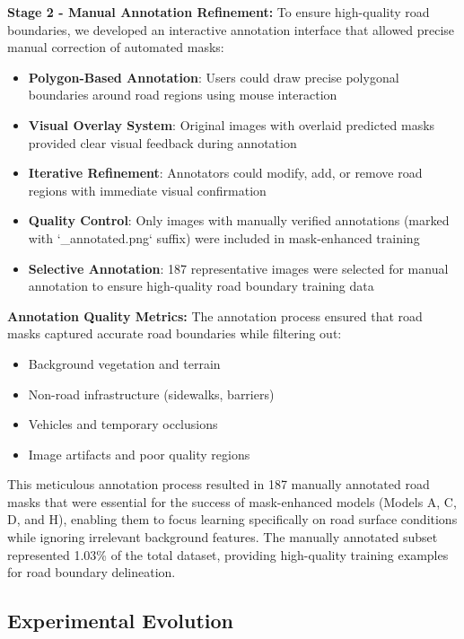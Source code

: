 \documentclass[12pt]{article}
\begin{document}
\textbf{Stage 2 - Manual Annotation Refinement:} To ensure high-quality road boundaries, we developed an interactive annotation interface that allowed precise manual correction of automated masks:

\begin{itemize}[itemsep=1pt,parsep=0pt,topsep=2pt]
\item \textbf{Polygon-Based Annotation}: Users could draw precise polygonal boundaries around road regions using mouse interaction
\item \textbf{Visual Overlay System}: Original images with overlaid predicted masks provided clear visual feedback during annotation
\item \textbf{Iterative Refinement}: Annotators could modify, add, or remove road regions with immediate visual confirmation
\item \textbf{Quality Control}: Only images with manually verified annotations (marked with `\_annotated.png` suffix) were included in mask-enhanced training
\item \textbf{Selective Annotation}: 187 representative images were selected for manual annotation to ensure high-quality road boundary training data
\end{itemize}

\textbf{Annotation Quality Metrics:}
The annotation process ensured that road masks captured accurate road boundaries while filtering out:
\begin{itemize}[itemsep=1pt,parsep=0pt,topsep=2pt]
\item Background vegetation and terrain
\item Non-road infrastructure (sidewalks, barriers)
\item Vehicles and temporary occlusions
\item Image artifacts and poor quality regions
\end{itemize}

This meticulous annotation process resulted in 187 manually annotated road masks that were essential for the success of mask-enhanced models (Models A, C, D, and H), enabling them to focus learning specifically on road surface conditions while ignoring irrelevant background features. The manually annotated subset represented 1.03\% of the total dataset, providing high-quality training examples for road boundary delineation.

\subsection{Experimental Evolution}
\end{document}
